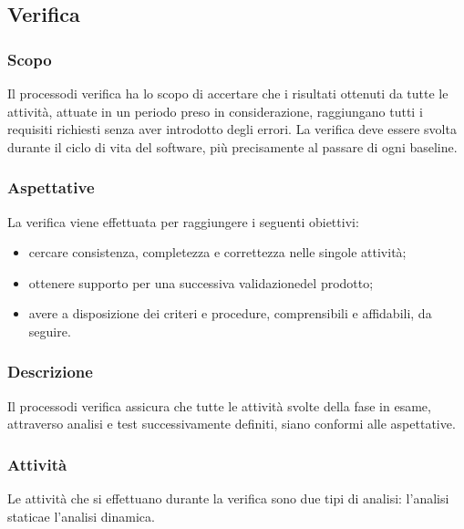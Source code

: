 \subsection{Verifica}
\subsubsection{Scopo}
Il processo\glosp di verifica ha lo scopo di accertare che i risultati ottenuti da tutte le attività, attuate in un periodo preso in considerazione, raggiungano tutti i requisiti richiesti senza aver introdotto degli errori. La verifica deve essere svolta durante il ciclo di vita del software, più precisamente al passare di ogni baseline\glo.
\subsubsection{Aspettative}
La verifica viene effettuata per raggiungere i seguenti obiettivi:
\begin{itemize}
	\item cercare consistenza, completezza e correttezza nelle singole attività;
	\item ottenere supporto per una successiva validazione\glosp del prodotto\glo;
	\item avere a disposizione dei criteri e procedure, comprensibili e affidabili, da seguire.
\end{itemize}
\subsubsection{Descrizione}
Il processo\glosp di verifica assicura che tutte le attività svolte della fase in esame, attraverso analisi e test successivamente definiti, siano conformi alle aspettative.
\subsubsection{Attività}
Le attività che si effettuano durante la verifica sono due tipi di analisi: l'analisi statica\glosp e l'analisi dinamica. \\[2mm]
